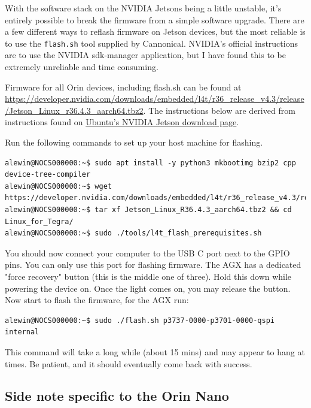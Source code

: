 \documentclass[11pt]{article}
\begin{document}
With the software stack on the NVIDIA Jetsons being a little unstable, it's entirely possible to break the firmware from a simple software upgrade. There are a few different ways to reflash firmware on Jetson devices, but the  most reliable is to use the \texttt{flash.sh} tool supplied by Cannonical. NVIDIA's official instructions are to use the NVIDIA sdk-manager application, but I have found this to be extremely unreliable and time consuming.

Firmware for all Orin devices, including flash.sh can be found at \href{https://developer.nvidia.com/downloads/embedded/l4t/r36_release_v4.3/release/Jetson_Linux_r36.4.3_aarch64.tbz2}{https://developer.nvidia.com/downloads/embedded/l4t/r36\_release\_v4.3/release/Jetson\_Linux\_r36.4.3\_aarch64.tbz2}. The instructions below are derived from instructions found on \href{https://ubuntu.com/download/nvidia-jetson}{Ubuntu's NVIDIA Jetson download page}.

Run the following commands to set up your host machine for flashing.

\lstset{style=console}
\begin{lstlisting}
alewin@NOCS000000:~$ sudo apt install -y python3 mkbootimg bzip2 cpp device-tree-compiler
alewin@NOCS000000:~$ wget https://developer.nvidia.com/downloads/embedded/l4t/r36_release_v4.3/release/Jetson_Linux_r36.4.3_aarch64.tbz2
alewin@NOCS000000:~$ tar xf Jetson_Linux_R36.4.3_aarch64.tbz2 && cd Linux_for_Tegra/
alewin@NOCS000000:~$ sudo ./tools/l4t_flash_prerequisites.sh
\end{lstlisting}

You should now connect your computer to the USB C port next to the GPIO pins. You can only use this port for flashing firmware. The AGX has a dedicated "force recovery" button (this is the middle one of three). Hold this down while powering the device on. Once the light comes on, you may release the button. Now start to flash the firmware, for the AGX run:

\lstset{style=console}
\begin{lstlisting}
alewin@NOCS000000:~$ sudo ./flash.sh p3737-0000-p3701-0000-qspi internal
\end{lstlisting}

This command will take a long while (about 15 mins) and may appear to hang at times. Be patient, and it should eventually come back with success.

\subsection*{Side note specific to the Orin Nano}
\end{document}
